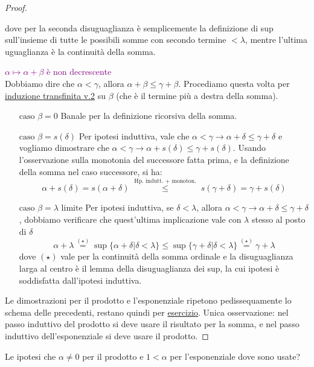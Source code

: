 \begin{proof}
\begin{itemize}
\[			\]
		dove per la seconda disuguaglianza è semplicemente la definizione di sup sull'insieme di tutte le possibili somme con secondo termine $<\lambda$, mentre l'ultima uguaglianza è la continuità della somma.
		\end{itemize}
	\textcolor{purple}{$\alpha \mapsto \alpha + \beta$ è non decrescente}\\
	Dobbiamo dire che $\alpha < \gamma$, allora $\alpha + \beta \leq \gamma + \beta$. Procediamo questa volta per \hyperref[induz_transf2]{induzione transfinita v.2} su $\beta$ (che è il termine più a destra della somma).
	\begin{itemize}
		\item[$\boxed{\text{caso $\beta = 0$}}$] Banale per la definizione ricorsiva della somma.
		\item[$\boxed{\text{caso $\beta = s(\delta)$}}$] Per ipotesi induttiva, vale che $\alpha < \gamma \rightarrow \alpha + \delta \leq \gamma + \delta$ e vogliamo dimostrare che $\alpha < \gamma \to \alpha + s(\delta) \leq \gamma + s(\delta)$.
		Usando l'osservazione sulla monotonia del successore fatta prima, e la definizione della somma nel caso successore, si ha:
		\[ \alpha + s(\delta) = s(\alpha + \delta) \;\overset{\text{Hp. indutt. + monoton.}}{\leq}\; s(\gamma + \delta) = \gamma + s(\delta)
			\]
		\item[$\boxed{\text{caso $\beta = \lambda$ limite}}$] Per ipotesi induttiva, se $\delta < \lambda$, allora $\alpha < \gamma \rightarrow \alpha + \delta \leq \gamma + \delta$, dobbiamo verificare che quest'ultima implicazione vale con $\lambda$ stesso al posto di $\delta$
		\[ \alpha + \lambda \overset{(\star)}{=} \sup \{\alpha + \delta | \delta < \lambda\} \leq \sup\{\gamma + \delta | \delta < \lambda\} \overset{(\star)}{=} \gamma + \lambda
			\]
		dove $(\star)$ vale per la continuità della somma ordinale e la disuguaglianza larga al centro è il lemma della disuguaglianza dei sup, la cui ipotesi è soddisfatta dall'ipotesi induttiva.
	\end{itemize}
	Le dimostrazioni per il prodotto e l'esponenziale ripetono pedissequamente lo schema delle precedenti, restano quindi per \underline{esercizio}. Unica osservazione:
	nel passo induttivo del prodotto si deve usare il risultato per la somma, e nel passo induttivo dell'esponenziale si deve usare il prodotto.
\end{proof}

\begin{exercise}
	Le ipotesi che $\alpha \ne 0$ per il prodotto e $1 < \alpha$ per l'esponenziale dove sono usate?
\end{exercise}

